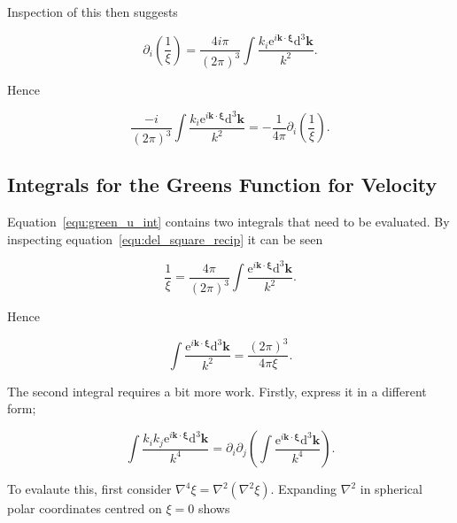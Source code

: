 \documentclass[12pt]{article}
\begin{document}
Inspection of this then suggests

\begin{equation}
\label{equ:grad_recip}
\partial_{i} \left(\frac{1}{\xi}\right) = \frac{4 i \pi}{(2 \pi)^{3}} \int \frac{ k_{i} \mathrm{e}^{i \boldsymbol{k} \cdot \boldsymbol{\xi}} \mathrm{d}^{3} \boldsymbol{k}}{k^{2}} .
\end{equation}

Hence

\begin{equation}
\label{equ:green_p_ident}
\frac{-i}{(2 \pi)^{3}} \int \frac{ k_{i} \mathrm{e}^{i \boldsymbol{k} \cdot \boldsymbol{\xi}} \mathrm{d}^{3} \boldsymbol{k}}{k^{2}} = -\frac{1}{4 \pi} \partial_{i} \left(\frac{1}{\xi}\right) .
\end{equation}

\subsection{Integrals for the Greens Function for Velocity}
\label{sub_app:green_vel}

Equation~\ref{equ:green_u_int} contains two integrals that need to be evaluated. By inspecting equation~\ref{equ:del_square_recip} it can be seen

\begin{equation}
\label{equ:recip_int}
\frac{1}{\xi} = \frac{4 \pi}{(2 \pi)^{3}} \int \frac{\mathrm{e}^{i \boldsymbol{k} \cdot \boldsymbol{\xi}} \mathrm{d}^{3} \boldsymbol{k}}{k^{2}} .
\end{equation}

Hence

\begin{equation}
\label{equ:green_u_int1}
\int \frac{\mathrm{e}^{i \boldsymbol{k} \cdot \boldsymbol{\xi}} \mathrm{d}^{3} \boldsymbol{k}}{k^{2}} = \frac{(2 \pi)^{3}}{4 \pi \xi} .
\end{equation}

The second integral requires a bit more work. Firstly, express it in a different form;

\begin{equation}
\label{equ:green_u_int2_new}
\int \frac{k_{i} k_{j} \mathrm{e}^{i \boldsymbol{k} \cdot \boldsymbol{\xi}} \mathrm{d}^{3} \boldsymbol{k}}{k^{4}} = \partial_{i} \partial_{j} \left(\int \frac{\mathrm{e}^{i \boldsymbol{k} \cdot \boldsymbol{\xi}} \mathrm{d}^{3} \boldsymbol{k}}{k^{4}} \right) .
\end{equation}

To evalaute this, first consider $\nabla^{4} \xi = \nabla^{2}(\nabla^{2} \xi)$. Expanding $\nabla^{2}$ in spherical polar coordinates centred on $\xi = 0$ shows
\end{document}
